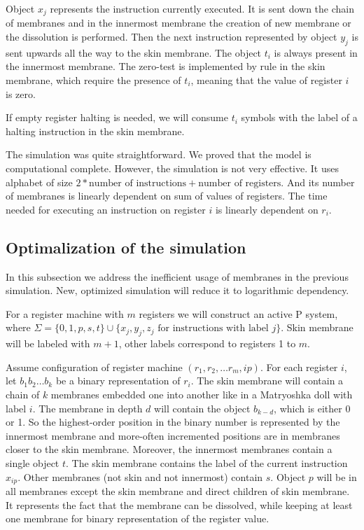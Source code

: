 \documentclass[llncs,submission,copyright,creativecommons]{../lib/lncs/llncs}
\begin{document}
Object $x_j$ represents the instruction currently executed. It is sent down the chain of membranes and in the innermost membrane the creation of new membrane or the dissolution is performed. Then the next instruction represented by object $y_j$ is sent upwards all the way to the skin membrane. The object $t_i$ is always present in the innermost membrane. The zero-test is implemented by rule in the skin membrane, which require the presence of $t_i$, meaning that the value of register $i$ is zero.  

If empty register halting is needed, we will consume $t_i$ symbols with the label of a halting instruction in the skin membrane.

The simulation was quite straightforward. We proved that the model is computational complete. However, the simulation is not very effective. It uses alphabet of size $2 * \text{number of instructions} + \text{number of registers}$. And its number of membranes is linearly dependent on sum of values of registers. The time needed for executing an instruction on register $i$ is linearly dependent on $r_i$.


\subsection{Optimalization of the simulation} %
\label{sub:optimalization_of_the_simulation}

In this subsection we address the inefficient usage of membranes in the previous simulation. New, optimized simulation will reduce it to logarithmic dependency.

For a register machine with $m$ registers we will construct an active P system, where $\Sigma = \{0,1,p,s,t\}\cup\{x_j, y_j, z_j \text{~for instructions with label~} j\}$. Skin membrane will be labeled with $m+1$, other labels correspond to registers 1 to $m$.

Assume configuration of register machine $(r_1, r_2, \ldots r_m, ip)$. For each register $i$, let $b_1b_2\ldots b_k$ be a binary representation of $r_i$. The skin membrane will contain a chain of $k$ membranes embedded one into another like in a Matryoshka doll with label $i$.
The membrane in depth $d$ will contain the object $b_{k-d}$, which is either 0 or 1. So the highest-order position in the binary number is represented by the innermost membrane and more-often incremented positions are in membranes closer to the skin membrane. Moreover, the innermost membranes contain a single object $t$. The skin membrane contains the label of the current instruction $x_{ip}$. Other membranes (not skin and not innermost) contain $s$. Object $p$ will be in all membranes except the skin membrane and direct children of skin membrane. It represents the fact that the membrane can be dissolved, while keeping at least one membrane for binary representation of the register value.
\end{document}
